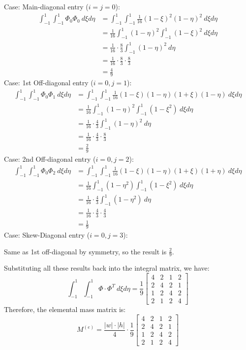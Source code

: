 \documentclass[12pt]{article}
\begin{document}
Case: Main-diagonal entry ($i=j=0$):
\begin{align*}
\int_{-1}^{1} \int_{-1}^{1} \Phi_0 \Phi_0 \ d\xi d\eta &= \int_{-1}^{1} \int_{-1}^{1} \frac{1}{16}(1-\xi)^2(1-\eta)^2 \ d\xi d\eta \\
&= \frac{1}{16} \int_{-1}^{1} (1-\eta)^2 \int_{-1}^1 (1-\xi)^2 \ d\xi d\eta \\
&= \frac{1}{16} \cdot \frac{8}{3} \int_{-1}^{1} (1-\eta)^2 \ d\eta \\
&= \frac{1}{16} \cdot \frac{8}{3} \cdot \frac{8}{3}\\
&= \frac{4}{9}
\end{align*}
Case: 1st Off-diagonal entry ($i=0, j=1$):
\begin{align*}
\int_{-1}^{1} \int_{-1}^{1} \Phi_0 \Phi_1 \ d\xi d\eta &= \int_{-1}^{1} \int_{-1}^{1} \frac{1}{16}(1-\xi)(1-\eta)(1+\xi)(1-\eta) \ d\xi d\eta \\
&= \frac{1}{16} \int_{-1}^{1} (1-\eta)^2 \int_{-1}^1 (1-\xi^2) \ d\xi d\eta \\
&= \frac{1}{16} \cdot \frac{4}{3} \int_{-1}^{1} (1-\eta)^2 \ d\eta \\
&= \frac{1}{16} \cdot \frac{4}{3} \cdot \frac{8}{3}\\
&= \frac{2}{9}
\end{align*}
Case: 2nd Off-diagonal entry ($i=0, j=2$):
\begin{align*}
\int_{-1}^{1} \int_{-1}^{1} \Phi_0 \Phi_2 \ d\xi d\eta &= \int_{-1}^{1} \int_{-1}^{1} \frac{1}{16}(1-\xi)(1-\eta)(1+\xi)(1+\eta) \ d\xi d\eta \\
&= \frac{1}{16} \int_{-1}^{1} (1-\eta^2) \int_{-1}^1 (1-\xi^2) \ d\xi d\eta \\
&= \frac{1}{16} \cdot \frac{4}{3} \int_{-1}^{1} (1-\eta^2) \ d\eta \\
&= \frac{1}{16} \cdot \frac{4}{3} \cdot \frac{4}{3}\\
&= \frac{1}{9}
\end{align*}
Case: Skew-Diagonal entry ($i=0, j=3$):

Same as 1st off-diagonal by symmetry, so the result is $\frac{2}{9}$.


Substituting all these results back into the integral matrix, we have:
\[\int_{-1}^{1} \int_{-1}^{1} \Phi \cdot \Phi^T \ d\xi d\eta = 
\frac{1}{9}
\begin{bmatrix}
4 & 2 & 1 & 2 \\
2 & 4 & 2 & 1 \\
1 & 2 & 4 & 2 \\
2 & 1 & 2 & 4
\end{bmatrix}\]
Therefore, the elemental mass matrix is:
\[M^{(e)} = \frac{|w| \cdot |h|}{4} \cdot \frac{1}{9}
\begin{bmatrix}
4 & 2 & 1 & 2 \\
2 & 4 & 2 & 1 \\
1 & 2 & 4 & 2 \\
2 & 1 & 2 & 4
\end{bmatrix}\]
\end{document}

